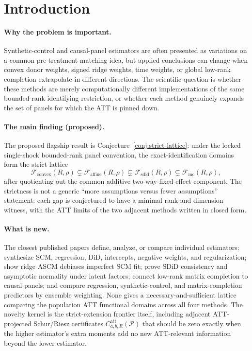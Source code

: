 \documentclass[11pt]{article}
\newcommand{\calF}{\mathcal{F}}
\theoremstyle{definition}
\theoremstyle{plain}
\theoremstyle{remark}
\begin{document}
\section{Introduction}

\paragraph{Why the problem is important.}
Synthetic-control and causal-panel estimators are often presented as variations on a common pre-treatment matching idea, but applied conclusions can change when convex donor weights, signed ridge weights, time weights, or global low-rank completion extrapolate in different directions. The scientific question is whether these methods are merely computationally different implementations of the same bounded-rank identifying restriction, or whether each method genuinely expands the set of panels for which the ATT is pinned down.

\paragraph{The main finding (proposed).}
The proposed flagship result is Conjecture~\ref{conj:strict-lattice}: under the locked single-shock bounded-rank panel convention, the exact-identification domains form the strict lattice
\[
\calF_{\mathrm{convex}}(R,\rho)\subsetneq
\calF_{\mathrm{affine}}(R,\rho)\subsetneq
\calF_{\mathrm{sdid}}(R,\rho)\subsetneq
\calF_{\mathrm{mc}}(R,\rho),
\]
after quotienting out the common additive two-way-fixed-effect component. The strictness is not a generic ``more assumptions versus fewer assumptions'' statement: each gap is conjectured to have a minimal rank and dimension witness, with the ATT limits of the two adjacent methods written in closed form.

\paragraph{What is new.}
The closest published papers define, analyze, or compare individual estimators: \citet{DoudchenkoImbens2016} synthesize SCM, regression, DiD, intercepts, negative weights, and regularization; \citet{BenMichaelFellerRothstein2021} show ridge ASCM debiases imperfect SCM fit; \citet{ArkhangelskyAtheyHirshbergImbensWager2021} prove SDiD consistency and asymptotic normality under latent factors; \citet{AtheyBayatiDoudchenkoImbensKhosravi2021} connect low-rank matrix completion to causal panels; and \citet{AtheyBayatiImbensQu2019} compare regression, synthetic-control, and matrix-completion predictors by ensemble weighting. None gives a necessary-and-sufficient lattice comparing the population ATT functional domains across all four methods. The novelty kernel is the strict-extension frontier itself, including adjacent ATT-projected Schur/Riesz certificates \(C^{\mathrm{att}}_{a,b,R}(\mathcal P)\) that should be zero exactly when the higher estimator's extra moments add no new ATT-relevant information beyond the lower estimator.
\end{document}
